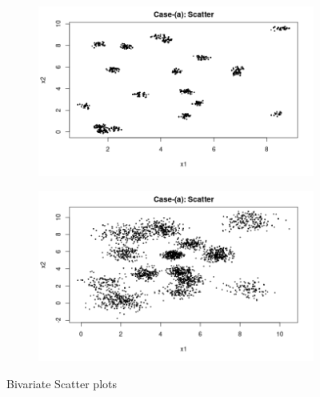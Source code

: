 \documentclass{article}
\begin{document}
\begin{figure}[ht]
\begin{subfigure}{.5\textwidth}
  \centering
  \includegraphics[width=.8\linewidth]{a1.png}  
  \label{fig:sub-first}
\end{subfigure}
\begin{subfigure}{.5\textwidth}
  \centering
  \includegraphics[width=.8\linewidth]{b1.png}  
  \label{fig:sub-second}
\end{subfigure}
\caption{Bivariate Scatter plots}
\label{fig:fig}
\end{figure}
\end{document}
